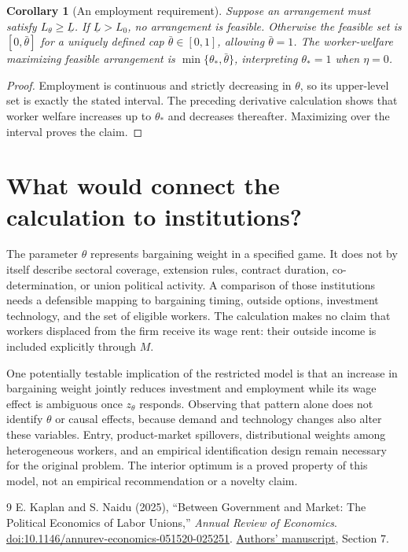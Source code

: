 \documentclass[11pt,a4paper]{article}
\newtheorem{corollary}[theorem]{Corollary}
\theoremstyle{remark}
\begin{document}
\begin{corollary}[An employment requirement]
Suppose an arrangement must satisfy $L_\theta\ge\underline L$. If $\underline L>L_0$, no arrangement is feasible. Otherwise the feasible set is $[0,\bar\theta]$ for a uniquely defined cap $\bar\theta\in[0,1]$, allowing $\bar\theta=1$. The worker-welfare maximizing feasible arrangement is $\min\{\theta_*,\bar\theta\}$, interpreting $\theta_*=1$ when $\eta=0$.
\end{corollary}
\begin{proof}
Employment is continuous and strictly decreasing in $\theta$, so its upper-level set is exactly the stated interval. The preceding derivative calculation shows that worker welfare increases up to $\theta_*$ and decreases thereafter. Maximizing over the interval proves the claim.
\end{proof}

\section{What would connect the calculation to institutions?}
The parameter $\theta$ represents bargaining weight in a specified game. It does not by itself describe sectoral coverage, extension rules, contract duration, co-determination, or union political activity. A comparison of those institutions needs a defensible mapping to bargaining timing, outside options, investment technology, and the set of eligible workers. The calculation makes no claim that workers displaced from the firm receive its wage rent: their outside income is included explicitly through $M$.

One potentially testable implication of the restricted model is that an increase in bargaining weight jointly reduces investment and employment while its wage effect is ambiguous once $z_\theta$ responds. Observing that pattern alone does not identify $\theta$ or causal effects, because demand and technology changes also alter these variables. Entry, product-market spillovers, distributional weights among heterogeneous workers, and an empirical identification design remain necessary for the original problem. The interior optimum is a proved property of this model, not an empirical recommendation or a novelty claim.

\begin{thebibliography}{9}
 E. Kaplan and S. Naidu (2025), ``Between Government and Market: The Political Economics of Labor Unions,'' \emph{Annual Review of Economics}. \href{https://doi.org/10.1146/annurev-economics-051520-025251}{doi:10.1146/annurev-economics-051520-025251}. \href{https://econweb.umd.edu/~kaplan/PE_of_Labor.pdf}{Authors' manuscript}, Section 7.
\end{thebibliography}
\end{document}
